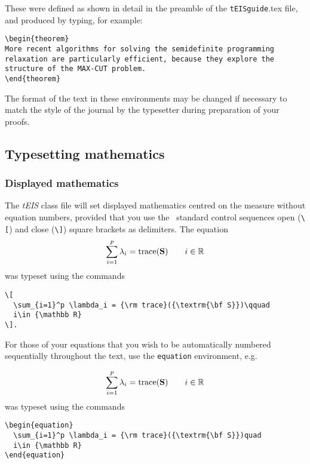 \documentclass[]{tEIS2e}
\theoremstyle{plain}
\newtheorem{theorem}{Theorem}[section]
\theoremstyle{remark}
\begin{document}
\noindent These were defined as shown in detail in the preamble of the \texttt{tEISguide}.tex file, and produced by typing, for example:
%
\begin{verbatim}
\begin{theorem}
More recent algorithms for solving the semidefinite programming
relaxation are particularly efficient, because they explore the
structure of the MAX-CUT problem.
\end{theorem}
\end{verbatim}
%
The format of the text in these environments may be changed if necessary to match the style of the journal by the typesetter during preparation of your proofs.


\subsection{Typesetting mathematics}\label{TMth}

\subsubsection{Displayed mathematics}

The {\it tEIS} class file will set displayed mathematics centred on the measure without equation numbers, provided
that you use the \LaTeXe\ standard control sequences open (\verb"\[") and close (\verb"\]") square brackets as
delimiters. The equation
\[
  \sum_{i=1}^p \lambda_i = {\rm trace}({\textrm{\bf S}})\qquad
  i\in {\mathbb R}
\]
\normalfont was typeset using the commands
%
\begin{verbatim}
\[
  \sum_{i=1}^p \lambda_i = {\rm trace}({\textrm{\bf S}})\qquad
  i\in {\mathbb R}
\].
\end{verbatim}

For those of your equations that you wish to be automatically
numbered sequentially throughout the text, use the {\tt{equation}}
environment, e.g.

\begin{equation}
  \sum_{i=1}^p \lambda_i = {\rm trace}({\textrm{\bf S}})\qquad
  i\in {\mathbb R}
\end{equation}
%
was typeset using the commands

\begin{verbatim}
\begin{equation}
  \sum_{i=1}^p \lambda_i = {\rm trace}({\textrm{\bf S}})quad
  i\in {\mathbb R}
\end{equation}
\end{verbatim}
\end{document}
